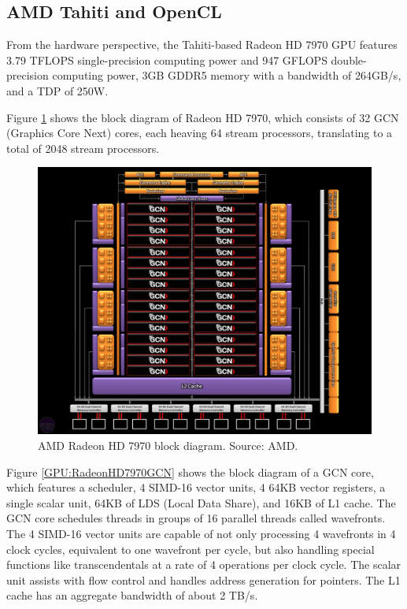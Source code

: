 \subsection{AMD Tahiti and OpenCL}

From the hardware perspective, the Tahiti-based Radeon HD 7970 GPU features 3.79 TFLOPS single-precision computing power and 947 GFLOPS double-precision computing power, 3GB GDDR5 memory with a bandwidth of 264GB/s, and a TDP of 250W.

Figure \ref{GPU:RadeonHD7970BlockDiagram} shows the block diagram of Radeon HD 7970, which consists of 32 GCN (Graphics Core Next) cores, each heaving 64 stream processors, translating to a total of 2048 stream processors.

\begin{figure}
\centering
\includegraphics[width=\textwidth]{GPU/RadeonHD7970BlockDiagram.jpg}
\caption{AMD Radeon HD 7970 block diagram. Source: AMD.}
\label{GPU:RadeonHD7970BlockDiagram}
\end{figure}

Figure \ref{GPU:RadeonHD7970GCN} shows the block diagram of a GCN core, which features a scheduler, 4 SIMD-16 vector units, 4 64KB vector registers, a single scalar unit, 64KB of LDS (Local Data Share), and 16KB of L1 cache. The GCN core schedules threads in groups of 16 parallel threads called wavefronts. The 4 SIMD-16 vector units are capable of not only processing 4 wavefronts in 4 clock cycles, equivalent to one wavefront per cycle, but also handling special functions like transcendentals at a rate of 4 operations per clock cycle. The scalar unit assists with flow control and handles address generation for pointers. The L1 cache has an aggregate bandwidth of about 2 TB/s.

